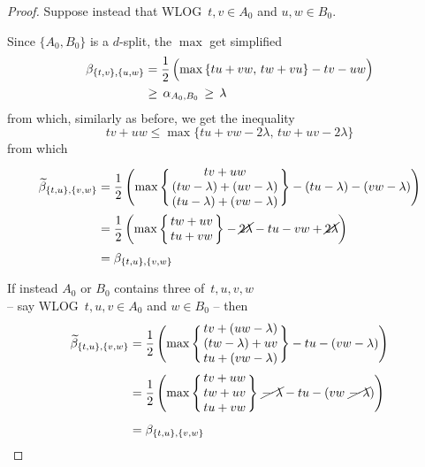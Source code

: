 \documentclass[./main.tex]{subfiles}
\begin{document}
\begin{proof}
\clearpage

    Suppose instead that WLOG $\, t,v \in A_0$ and $u,w \in B_0$.
    
    Since $\{A_0,B_0\}$ is a $d$-split, the $\max$ get simplified
    \begin{align*}
        \beta_{\{t,v\},\{u,w\}} &= \frac{1}{2}\, \Bigl( \max {\{ tu + vw,\, tw + vu \}} - tv - uw \Bigr) \\
        &\geq\, \alpha_{A_0,B_0} \,\geq\, \lambda
    \end{align*}
    from which, similarly as before, we get the inequality
    \[ tv + uw \leq \max {\{ tu + vw - 2 \lambda,\, tw + uv - 2 \lambda \}} \]
    from which
    \begin{align*}
        \widetilde{\beta}_{\{t,u\},\{v,w\}} &= \frac{1}{2}\, \Biggl( \max {\Biggl\{\!\!
            \begin{array}{c}
                tv + uw \\
                (tw - \lambda) + (uv - \lambda) \\
                (tu - \lambda) + (vw - \lambda)
            \end{array}
        \!\!\Biggr\}} - (tu - \lambda) - (vw - \lambda) \Biggr) \\
        &= \frac{1}{2}\, \biggl( \max {\biggl\{\!\!
            \begin{array}{c}
                tw + uv \\
                tu + vw \\
            \end{array}
        \!\!\biggr\}} - \cancel{2 \lambda} - tu - vw + \cancel{2 \lambda} \biggr) \\[2pt]
        &= \beta_{\{t,u\},\{v,w\}}
    \end{align*} \medskip

    If instead $A_0$ or $B_0$ contains three of $\, t,u,v,w$ \\
    -- say WLOG $\, t,u,v \in A_0$ and $w \in B_0$ -- then
    \begin{align*}
        \widetilde{\beta}_{\{t,u\},\{v,w\}} &= \frac{1}{2}\, \Biggl( \max {\Biggl\{\!\!
            \begin{array}{c}
                tv + (uw - \lambda) \\
                (tw - \lambda) + uv \\
                tu + (vw - \lambda)
            \end{array}
        \!\!\Biggr\}} - tu - (vw - \lambda) \Biggr) \\
        &= \frac{1}{2}\, \Biggl( \max {\Biggl\{\!\!
            \begin{array}{c}
                tv + uw \\
                tw + uv \\
                tu + vw
            \end{array}
        \!\!\Biggr\}} \ \cancel{-\ \lambda} - tu - (vw \ \cancel{-\ \lambda}) \Biggr) \\[2pt]
        &= \beta_{\{t,u\},\{v,w\}}
    \end{align*} \smallskip


\end{proof}
\end{document}
